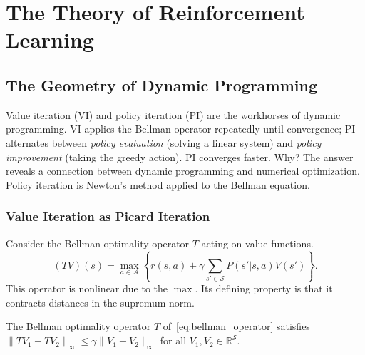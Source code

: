 
\section{The Theory of Reinforcement Learning}
\label{sec:planning_learning}

\subsection{The Geometry of Dynamic Programming}
\label{sec:newton_connection}

Value iteration (VI) and policy iteration (PI) are the workhorses of dynamic programming. VI applies the Bellman operator repeatedly until convergence; PI alternates between \emph{policy evaluation} (solving a linear system) and \emph{policy improvement} (taking the greedy action). PI converges faster. Why? The answer reveals a connection between dynamic programming and numerical optimization. Policy iteration is Newton's method applied to the Bellman equation.

\subsubsection{Value Iteration as Picard Iteration}

Consider the Bellman optimality operator $T$ acting on value functions.
\begin{equation}
(TV)(s) = \max_{a \in \mathcal{A}} \left\{ r(s,a) + \gamma \sum_{s' \in \mathcal{S}} P(s'|s,a) V(s') \right\}.
\label{eq:bellman_operator}
\end{equation}
This operator is nonlinear due to the $\max$. Its defining property is that it contracts distances in the supremum norm.

\begin{lemma}
\label{lem:bellman_contraction}
The Bellman optimality operator $T$ of~\eqref{eq:bellman_operator} satisfies $\|TV_1 - TV_2\|_\infty \leq \gamma \|V_1 - V_2\|_\infty$ for all $V_1, V_2 \in \mathbb{R}^{\mathcal{S}}$.
\end{lemma}

